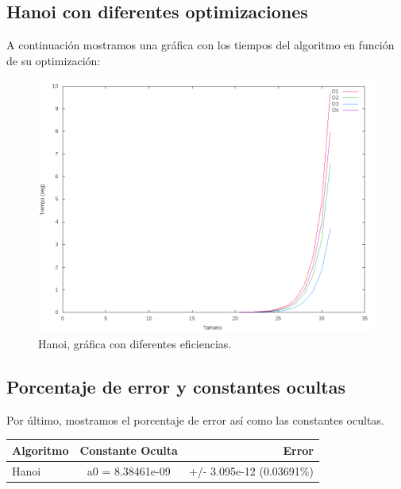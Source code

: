 \subsection{Hanoi con diferentes optimizaciones}
A continuación mostramos una gráfica con los tiempos del algoritmo en función de su optimización:
\begin{figure}[H]
	\centering
	\includegraphics[scale=0.5]{imagenes/HanoiComparacion.png}
	\caption{Hanoi, gráfica con diferentes eficiencias.}
	\label{fig:E22}
\end{figure}



\subsection{Porcentaje de error y constantes ocultas}
Por último, mostramos el porcentaje de error así como las constantes ocultas.\\
\begin{center}
	\begin{tabular}{| l | c | r |}
		\hline
		\textbf{Algoritmo} & \textbf{Constante Oculta} & \textbf{Error} \\ \hline
		Hanoi & a0 = 8.38461e-09 & +/- 3.095e-12    (0.03691\%)\\ \hline
	\end{tabular}
\end{center}



